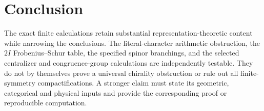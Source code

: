 \documentclass[11pt,a4paper]{amsart}
\begin{document}
\section{Conclusion}
The exact finite calculations retain substantial representation-theoretic
content while narrowing the conclusions. The literal-character arithmetic
obstruction, the $2I$ Frobenius--Schur table, the specified spinor branchings,
and the selected centralizer and congruence-group calculations are
independently testable. They do not by themselves prove a universal
chirality obstruction or rule out all finite-symmetry compactifications.
A stronger claim must state its geometric, categorical and physical inputs
and provide the corresponding proof or reproducible computation.


\end{document}
